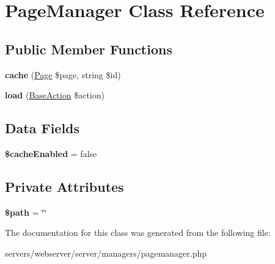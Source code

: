 \hypertarget{class_lora_1_1_page_manager}{}\section{Page\+Manager Class Reference}
\label{class_lora_1_1_page_manager}
\subsection*{Public Member Functions}
\begin{DoxyCompactItemize}
\item 
\mbox{\label{class_lora_1_1_page_manager_ad3e2c2ddb1a0601061eadd0d48404fd0}} 
{\bfseries cache} (\hyperlink{class_lora_1_1_page}{Page} \$page, string \$id)
\item 
\mbox{\label{class_lora_1_1_page_manager_a766144b3d568ea2b61e4432c62da9dee}} 
{\bfseries load} (\hyperlink{class_lora_1_1_base_action}{Base\+Action} \$action)
\end{DoxyCompactItemize}
\subsection*{Data Fields}
\begin{DoxyCompactItemize}
\item 
\mbox{\label{class_lora_1_1_page_manager_a7741f32e8202cda9b33453211d3c18f3}} 
{\bfseries \$cache\+Enabled} = false
\end{DoxyCompactItemize}
\subsection*{Private Attributes}
\begin{DoxyCompactItemize}
\item 
\mbox{\label{class_lora_1_1_page_manager_a0a4baf0b22973c07685c3981f0d17fc4}} 
{\bfseries \$path} = \char`\"{}\char`\"{}
\end{DoxyCompactItemize}


The documentation for this class was generated from the following file\+:\begin{DoxyCompactItemize}
\item 
servers/webserver/server/managers/pagemanager.\+php\end{DoxyCompactItemize}
